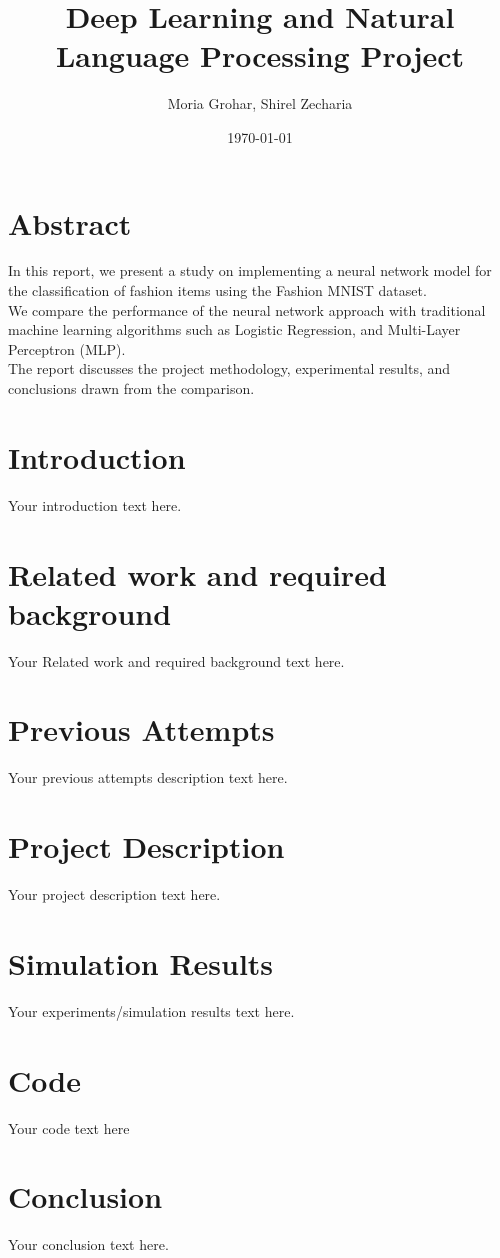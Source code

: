 \documentclass{article}
\title{Deep Learning and Natural Language Processing Project}
\author{Moria Grohar, Shirel Zecharia}
\date{\today}
\begin{document}
\maketitle

\section{Abstract}
In this report, we present a study on implementing a neural network model for the classification of fashion items using the Fashion MNIST dataset.\\
We compare the performance of the neural network approach with traditional machine learning algorithms such as Logistic Regression, and Multi-Layer Perceptron (MLP).\\
The report discusses the project methodology, experimental results, and conclusions drawn from the comparison.

\section{Introduction}
Your introduction text here.

\section{Related work and required background}  
Your Related work and required background text here.

\section{Previous Attempts}
Your previous attempts description text here.

\section{Project Description}
Your project description text here.

\section{Simulation Results}
Your experiments/simulation results text here.

\section{Code}
Your code text here

\section{Conclusion}
Your conclusion text here.
\end{document}
